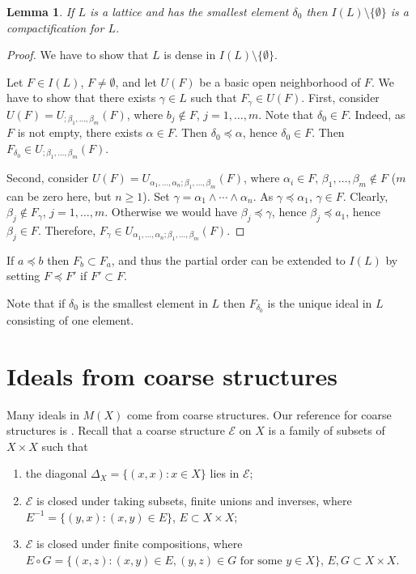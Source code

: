 \documentclass[reqno,12pt]{amsart}
\theoremstyle{plain}%
\newtheorem{lem}[thm]{Lemma}
\theoremstyle{definition}
\theoremstyle{remark}
\numberwithin{equation}{section}
\begin{document}
\begin{lem}
If $L$ is a lattice and has the smallest element $\delta_0$ then $I(L)\setminus\{\emptyset\}$ is a compactification for $L$.

\end{lem}
\begin{proof}
We have to show that $L$ is dense in $I(L)\setminus\{\emptyset\}$.


Let $F\in I(L)$, $F\neq\emptyset$, and let $U(F)$ be a basic open neighborhood of $F$. We have to show that there exists $\gamma\in L$ such that $F_\gamma\in U(F)$. First, consider $U(F)=U_{;\beta_1,\ldots,\beta_m}(F)$, where $b_j\notin F$, $j=1,\ldots,m$. Note that $\delta_0\in F$. Indeed, as $F$ is not empty, there exists $\alpha\in F$. Then $\delta_0\preceq\alpha$, hence $\delta_0\in F$. Then $F_{\delta_0}\in U_{;\beta_1,\ldots,\beta_m}(F)$.

Second, consider $U(F)=U_{\alpha_1,\ldots,\alpha_n;\beta_1,\ldots,\beta_m}(F)$, where $\alpha_i\in F$, $\beta_1,\ldots,\beta_m\notin F$ ($m$ can be zero here, but $n\geq 1$). Set $\gamma=\alpha_1\land\cdots\land\alpha_n$. As $\gamma\preceq\alpha_1$, $\gamma\in F$. Clearly, $\beta_j\notin F_\gamma$, $j=1,\ldots,m$. Otherwise we would have $\beta_j\preceq\gamma$, hence $\beta_j\preceq a_1$, hence $\beta_j\in F$. Therefore, $F_\gamma\in U_{\alpha_1,\ldots,\alpha_n;\beta_1,\ldots,\beta_m}(F)$.  \end{proof}



If $a\preceq b$ then $F_b\subset F_a$, and thus the partial order can be extended to $I(L)$ by setting $F\preceq F'$ if $F'\subset F$.

Note that if $\delta_0$ is the smallest element in $L$ then $F_{\delta_0}$ is the unique ideal in $L$ consisting of one element. 


\section{Ideals from coarse structures}

Many ideals in $M(X)$ come from coarse structures. Our reference for coarse structures is \cite{Roe}. Recall that a coarse structure $\mathcal E$ on $X$ is a family of subsets of $X\times X$ such that
\begin{enumerate}
\item
the diagonal $\Delta_X=\{(x,x):x\in X\}$ lies in $\mathcal E$;
\item
$\mathcal E$ is closed under taking subsets, finite unions and inverses, where $E^{-1}=\{(y,x):(x,y)\in E\}$, $E\subset X\times X$;
\item
$\mathcal E$ is closed under finite compositions, where $E\circ G=\{(x,z):(x,y)\in E, (y,z)\in G \mbox{\ for\ some\ }y\in X\}$, $E,G\subset X\times X$.
\end{enumerate}
\end{document}
